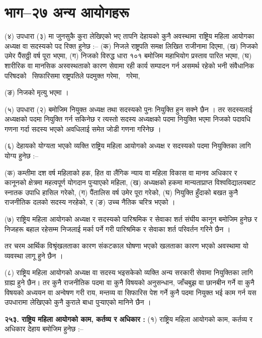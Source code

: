 \section{भाग–२७ अन्य आयोगहरू}

(४) उपधारा (३) मा जुनसुकै कुरा लेखिएको भए तापनि देहायको कुनै अवस्थामा राष्ट्रिय महिला आयोगका अध्यक्ष वा सदस्यको पद रिक्त हुनेछ :–
(क) निजले राष्ट्रपति समक्ष लिखित राजीनामा दिएमा,
(ख) निजको उमेर पैंसठ्ठी वर्ष पूरा भएमा,
(ग) निजको विरुद्ध धारा १०१ बमोजिम महाभियोग प्रस्ताव पारित भएमा,
(घ) शारीरिक वा मानसिक अस्वस्थताको कारण सेवामा रही कार्य सम्पादन गर्न असमर्थ रहेको भनी संवैधानिक परिषदको  सिफारिसमा राष्ट्रपतिले पदमुक्त गरेमा,  गरेमा,

(ङ) निजको मृत्यु भएमा ।

(५) उपधारा (२) बमोजिम नियुक्त अध्यक्ष तथा सदस्यको पुनः नियुक्ति हुन सक्ने छैन ।
तर सदस्यलाई अध्यक्षको पदमा नियुक्ति गर्न सकिनेछ र त्यस्तो सदस्य अध्यक्षको पदमा नियुक्ति भएमा निजको पदावधि गणना गर्दा सदस्य भएको अवधिलाई समेत जोडी गणना गरिनेछ ।

(६) देहायको योग्यता भएको व्यक्ति राष्ट्रिय महिला आयोगको अध्यक्ष र सदस्यको पदमा नियुक्तिका लागि योग्य हुनेछ :–

(क) कम्तीमा दश वर्ष महिलाको हक, हित वा लैंगिक न्याय वा महिला विकास वा मानव अधिकार र कानूनको क्षेत्रमा महत्वपूर्ण योगदान पुर्‍याएको महिला,
(ख) अध्यक्षको हकमा मान्यताप्राप्त विश्वविद्यालयबाट स्नातक उपाधि हासिल गरेको,
(ग) पैंतालिस वर्ष उमेर पूरा गरेको,
(घ) नियुक्ति हुँदाको बखत कुनै राजनीतिक दलको सदस्य नरहेको, र
(ङ) उच्च नैतिक चरित्र भएको ।

(७) राष्ट्रिय महिला आयोगको अध्यक्ष र सदस्यको पारिश्रमिक र सेवाका शर्त संघीय कानून बमोजिम हुनेछ र निजहरू बहाल रहेसम्म निजलाई मर्का पर्ने गरी पारिश्रमिक र सेवाका शर्त परिवर्तन गरिने छैन ।

तर चरम आर्थिक विश्रृंखलताका कारण संकटकाल घोषणा भएको खलताका कारण भएको अवस्थामा यो व्यवस्था लागू हुने छैन ।

(८) राष्ट्रिय महिला आयोगको अध्यक्ष वा सदस्य भइसकेको व्यक्ति अन्य सरकारी सेवामा नियुक्तिका लागि ग्राह्य हुने छैन।
तर कुनै राजनीतिक पदमा वा कुनै विषयको अनुसन्धान, जाँचबुझ वा छानबीन गर्ने वा कुनै विषयको अध्ययन वा अन्वेषण गरी राय, मन्तव्य वा सिफारिस पेश गर्ने कुनै पदमा नियुक्त भई काम गर्न यस उपधारामा लेखिएको कुनै कुराले बाधा पुर्‍याएको मानिने छैन ।

\textbf{२५३. राष्ट्रिय महिला आयोगको काम, कर्तव्य र अधिकार :} (१) राष्ट्रिय महिला आयोगको काम, कर्तव्य र अधिकार देहाय बमोजिम हुनेछ :–

